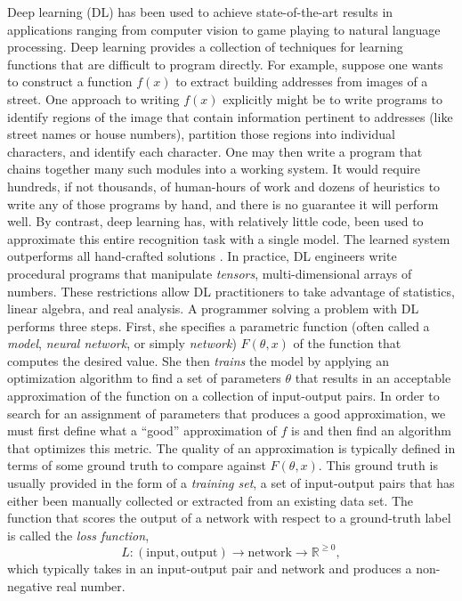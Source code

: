 Deep learning (DL) has been used to achieve state-of-the-art results in
  applications ranging from computer vision to game
  playing to natural language processing.
Deep learning provides a collection of techniques for learning functions that are difficult
  to program directly.
For example, suppose one wants to construct a function $f(x)$ to extract building addresses from
  images of a street.
One approach to writing $f(x)$ explicitly might be to write programs to identify
  regions of the image that contain information pertinent to addresses (like street names or house
  numbers), partition those regions into individual characters, and identify each character.
One may then write a program that chains together many such modules into a working system.
It would require hundreds, if not thousands, of human-hours of work and dozens of heuristics to
  write any of those programs by hand, and there is no guarantee it will perform well.
By contrast, deep learning has, with relatively little code, been
  used to approximate this entire recognition task with a single model.
The learned system outperforms all hand-crafted solutions \citep{streetview}.
In practice, DL engineers write procedural programs that manipulate \textit{tensors},
  multi-dimensional arrays of numbers.
These restrictions allow DL practitioners to take advantage of
  statistics, linear algebra, and real analysis.
A programmer solving a problem with DL performs three steps.
First, she specifies a parametric function (often called a \textit{model},
  \textit{neural network}, or simply \textit{network}) $F(\theta, x)$ of the function
  that computes the desired value.
She then \textit{trains} the model by applying an optimization algorithm to find a set of
  parameters $\theta$ that results in an acceptable approximation of the function on a
  collection of input-output pairs.
In order to search for an assignment of parameters that produces a good approximation, we must first
  define what a ``good'' approximation of $f$ is and then find an algorithm that optimizes this metric.
The quality of an approximation is typically defined in terms of some ground truth to
  compare against $F(\theta, x)$.
This ground truth is usually provided in the form of a
\textit{training set}, a set of input-output pairs that has either been manually collected or
  extracted from an existing data set.
The function that scores the output of a network with respect
  to a ground-truth label is called the \textit{loss function},
\[
  L \colon (\text{input}, \text{output}) \to \text{network} \to \mathbb{R}^{\ge 0},
\]
which typically takes in an input-output pair and network and produces a non-negative real
number.

